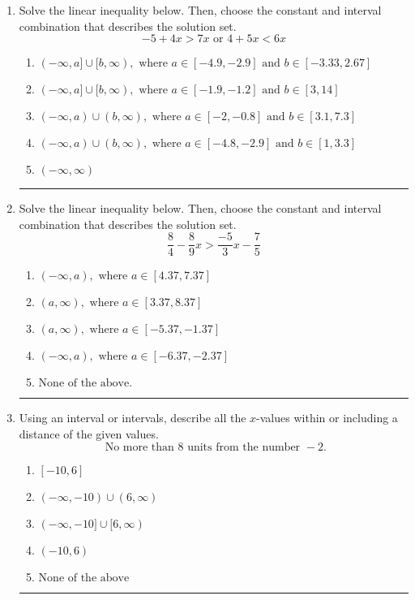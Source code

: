 \documentclass[14pt]{extbook}
\newcommand{\litem}[1]{\item#1\hspace*{-1cm}\rule{\textwidth}{0.4pt}}
\begin{document}
\begin{enumerate}
{\begin{enumerate}[label=\Alph*.]
\end{enumerate} }
\litem{
Solve the linear inequality below. Then, choose the constant and interval combination that describes the solution set.\[ -5 + 4 x > 7 x \text{ or } 4 + 5 x < 6 x \]\begin{enumerate}[label=\Alph*.]
\item \( (-\infty, a] \cup [b, \infty), \text{ where } a \in [-4.9, -2.9] \text{ and } b \in [-3.33, 2.67] \)
\item \( (-\infty, a] \cup [b, \infty), \text{ where } a \in [-1.9, -1.2] \text{ and } b \in [3, 14] \)
\item \( (-\infty, a) \cup (b, \infty), \text{ where } a \in [-2, -0.8] \text{ and } b \in [3.1, 7.3] \)
\item \( (-\infty, a) \cup (b, \infty), \text{ where } a \in [-4.8, -2.9] \text{ and } b \in [1, 3.3] \)
\item \( (-\infty, \infty) \)

\end{enumerate} }
\litem{
Solve the linear inequality below. Then, choose the constant and interval combination that describes the solution set.\[ \frac{8}{4} - \frac{8}{9} x > \frac{-5}{3} x - \frac{7}{5} \]\begin{enumerate}[label=\Alph*.]
\item \( (-\infty, a), \text{ where } a \in [4.37, 7.37] \)
\item \( (a, \infty), \text{ where } a \in [3.37, 8.37] \)
\item \( (a, \infty), \text{ where } a \in [-5.37, -1.37] \)
\item \( (-\infty, a), \text{ where } a \in [-6.37, -2.37] \)
\item \( \text{None of the above}. \)

\end{enumerate} }
\litem{
Using an interval or intervals, describe all the $x$-values within or including a distance of the given values.\[ \text{ No more than } 8 \text{ units from the number } -2. \]\begin{enumerate}[label=\Alph*.]
\item \( [-10, 6] \)
\item \( (-\infty, -10) \cup (6, \infty) \)
\item \( (-\infty, -10] \cup [6, \infty) \)
\item \( (-10, 6) \)
\item \( \text{None of the above} \)

\end{enumerate} }
\end{enumerate}
\end{document}
